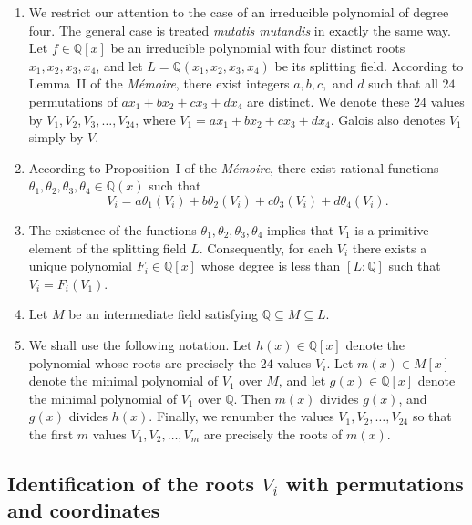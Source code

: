 \documentclass[a4paper,11pt]{article}
\begin{document}
\begin{enumerate}
	
	\item
	We restrict our attention to the case of an irreducible polynomial of degree four. The general case is treated \emph{mutatis mutandis} in exactly the same way. Let \(f\in\mathbb{Q}[x]\) be an irreducible polynomial with four distinct roots \(x_1,x_2,x_3,x_4\), and let \(L=\mathbb{Q}(x_1,x_2,x_3,x_4)\) be its splitting field. According to Lemma~II of the \textit{Mémoire}, there exist integers \(a,b,c,\) and \(d\) such that all \(24\) permutations of \(ax_1+bx_2+cx_3+dx_4\) are distinct. We denote these \(24\) values by \(V_1,V_2,V_3,\dots,V_{24}\), where \(V_1=ax_1+bx_2+cx_3+dx_4\). Galois also denotes \(V_1\) simply by \(V\).
	
	\item
	According to Proposition~I of the \textit{Mémoire}, there exist rational functions \(\theta_1,\theta_2,\theta_3,\theta_4\in\mathbb{Q}(x)\) such that
	\[
	V_i=a\theta_1(V_i)+b\theta_2(V_i)+c\theta_3(V_i)+d\theta_4(V_i).
	\]
	
	\item
	The existence of the functions \(\theta_1,\theta_2,\theta_3,\theta_4\) implies that \(V_1\) is a primitive element of the splitting field \(L\). Consequently, for each \(V_i\) there exists a unique polynomial \(F_i\in\mathbb{Q}[x]\) whose degree is less than \([L:\mathbb{Q}]\) such that \(V_i=F_i(V_1)\).
	
	\item
	Let \(M\) be an intermediate field satisfying \(\mathbb{Q}\subseteq M\subseteq L\).
	
	\item
	We shall use the following notation. Let \(h(x)\in\mathbb{Q}[x]\) denote the polynomial whose roots are precisely the \(24\) values \(V_i\). Let \(m(x)\in M[x]\) denote the minimal polynomial of \(V_1\) over \(M\), and let \(g(x)\in\mathbb{Q}[x]\) denote the minimal polynomial of \(V_1\) over \(\mathbb{Q}\). Then \(m(x)\) divides \(g(x)\), and \(g(x)\) divides \(h(x)\). Finally, we renumber the values
	\(
	V_1,V_2,\dots,V_{24}
	\)
	so that the first \(m\) values
	\(
	V_1,V_2,\dots,V_m
	\)
	are precisely the roots of \(m(x)\).
	
\end{enumerate}

\subsection{Identification of the roots \(V_i\) with permutations and coordinates}
\end{document}
